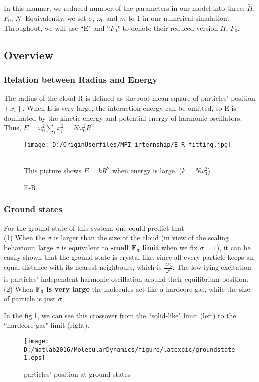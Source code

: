 \documentclass[aps,pre,twocolumn
,groupedaddress]{revtex4-1}
\begin{document}
In this manner, we reduced number of the parameters in our model into three: $\tilde{H}$, $\tilde{F_0}$, $N$. Equivalently, we set $\sigma$, $\omega_0$ and $m$ to 1 in our numerical simulation. Throughout, we will use ``E" and ``$F_0$" to denote their reduced version  $\tilde{H}$, $\tilde{F_0}$.

\subsection{Overview}
\subsubsection{Relation between Radius and Energy}
The radius of the cloud R is defined as the root-mean-square of particles' position $\left\lbrace x_i\right\rbrace$. When E is very large, the interaction energy can be omitted, so E is dominated by the kinetic energy and potential energy of harmonic oscillators. Thus, $E=\omega_0^2\sum_{i}x_i^2=N\omega_0^2R^2$ 
\begin{figure}[hbtp]
\centering
\texttt{[image: D:/OriginUserfiles/MPI\_internship/E\_R\_fitting.jpg]}
-\caption{E-R} This picture shows $E=kR^2$ when energy is large. ($k=N\omega_0^2$)
\end{figure}

\subsubsection{Ground states}
For the ground state of this system, one could predict that \\(1) When the $\sigma$ is larger than the size of the cloud (in view of the scaling behaviour, large $\sigma$ is equivalent to \textbf{small $\mathbf{F_0}$ limit} when we fix $\sigma=1$), it can be easily shown that the ground state is crystal-like, since all every particle keeps an equal distance with its nearest neighbours, which is $\frac{2F_0}{\omega_0^2}$. The low-lying excitation is particles' independent harmonic oscillation around their equilibrium position.\\(2) When \textbf{$\mathbf{F_0}$ is very large} the molecules act like a hardcore gas, while the size of particle is just $\sigma$.

In the fig.\ref{fig:GS1}, we can see this crossover from the ``solid-like" limit (left) to the ``hardcore gas" limit (right).

\begin{figure}[hbtp]
\centering
\texttt{[image: D:/matlab2016/MolecularDynamics/figure/latexpic/groundstate1.eps]}
\caption{particles' position at ground states }
\label{fig:GS1}
\end{figure}
\end{document}
